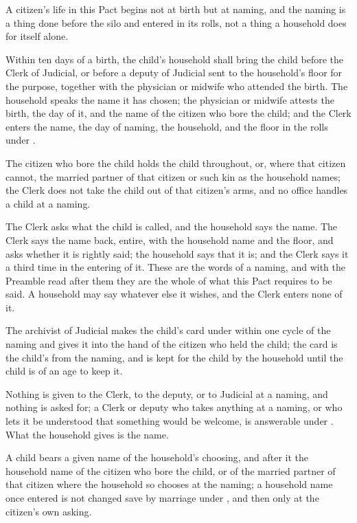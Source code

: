 A citizen's life in this Pact begins not at birth but at naming, and the naming is a thing done before the silo and entered in its rolls, not a thing a household does for itself alone.

\begin{clauses}
\item Within ten days of a birth, the child's household shall bring the child before the Clerk of Judicial, or before a deputy of Judicial sent to the household's floor for the purpose, together with the physician or midwife who attended the birth. The household speaks the name it has chosen; the physician or midwife attests the birth, the day of it, and the name of the citizen who bore the child; and the Clerk enters the name, the day of naming, the household, and the floor in the rolls under .
\item The citizen who bore the child holds the child throughout, or, where that citizen cannot, the married partner of that citizen or such kin as the household names; the Clerk does not take the child out of that citizen's arms, and no office handles a child at a naming.
\item The Clerk asks what the child is called, and the household says the name. The Clerk says the name back, entire, with the household name and the floor, and asks whether it is rightly said; the household says that it is; and the Clerk says it a third time in the entering of it. These are the words of a naming, and with the Preamble read after them they are the whole of what this Pact requires to be said. A household may say whatever else it wishes, and the Clerk enters none of it.
\item The archivist of Judicial makes the child's card under  within one cycle of the naming and gives it into the hand of the citizen who held the child; the card is the child's from the naming, and is kept for the child by the household until the child is of an age to keep it.
\item Nothing is given to the Clerk, to the deputy, or to Judicial at a naming, and nothing is asked for; a Clerk or deputy who takes anything at a naming, or who lets it be understood that something would be welcome, is answerable under . What the household gives is the name.
\item A child bears a given name of the household's choosing, and after it the household name of the citizen who bore the child, or of the married partner of that citizen where the household so chooses at the naming; a household name once entered is not changed save by marriage under , and then only at the citizen's own asking.

\end{clauses}

